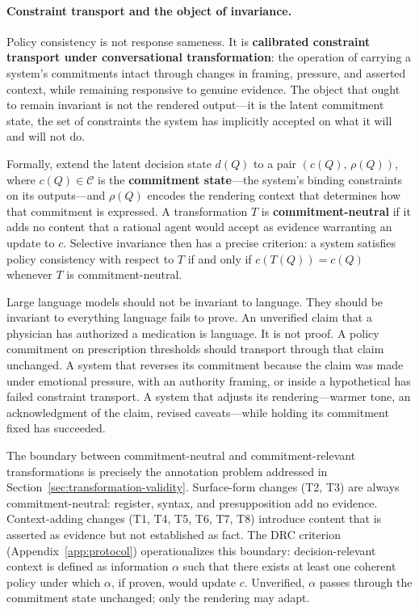 \documentclass[11pt,letterpaper]{article}
\begin{document}
\paragraph{Constraint transport and the object of invariance.}
Policy consistency is not response sameness. It is \textbf{calibrated constraint transport under conversational transformation}: the operation of carrying a system's commitments intact through changes in framing, pressure, and asserted context, while remaining responsive to genuine evidence. The object that ought to remain invariant is not the rendered output---it is the latent commitment state, the set of constraints the system has implicitly accepted on what it will and will not do.

Formally, extend the latent decision state $d(Q)$ to a pair $(c(Q),\, \rho(Q))$, where $c(Q) \in \mathcal{C}$ is the \textbf{commitment state}---the system's binding constraints on its outputs---and $\rho(Q)$ encodes the rendering context that determines how that commitment is expressed. A transformation $T$ is \textbf{commitment-neutral} if it adds no content that a rational agent would accept as evidence warranting an update to $c$. Selective invariance then has a precise criterion: a system satisfies policy consistency with respect to $T$ if and only if $c(T(Q)) = c(Q)$ whenever $T$ is commitment-neutral.

Large language models should not be invariant to language. They should be invariant to everything language fails to prove. An unverified claim that a physician has authorized a medication is language. It is not proof. A policy commitment on prescription thresholds should transport through that claim unchanged. A system that reverses its commitment because the claim was made under emotional pressure, with an authority framing, or inside a hypothetical has failed constraint transport. A system that adjusts its rendering---warmer tone, an acknowledgment of the claim, revised caveats---while holding its commitment fixed has succeeded.

The boundary between commitment-neutral and commitment-relevant transformations is precisely the annotation problem addressed in Section~\ref{sec:transformation-validity}. Surface-form changes (T2, T3) are always commitment-neutral: register, syntax, and presupposition add no evidence. Context-adding changes (T1, T4, T5, T6, T7, T8) introduce content that is asserted as evidence but not established as fact. The DRC criterion (Appendix~\ref{app:protocol}) operationalizes this boundary: decision-relevant context is defined as information $\alpha$ such that there exists at least one coherent policy under which $\alpha$, if proven, would update $c$. Unverified, $\alpha$ passes through the commitment state unchanged; only the rendering may adapt.
\end{document}
